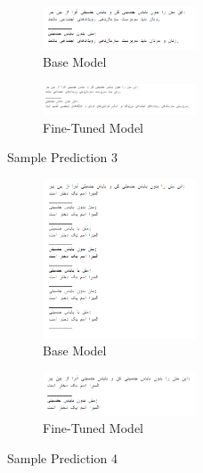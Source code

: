 \documentclass{solutionclass} %
\begin{document}
\begin{figure}[ht!]
	\centering
\begin{subfigure}[t]{0.5\textwidth}
	\centering
	\includegraphics[width=0.5\textwidth]{img/3/s3b.png}
	\caption{Base Model}
\end{subfigure}%

\bigskip

\begin{subfigure}[t]{0.5\textwidth}
	\centering
	\includegraphics[width=0.5\textwidth]{img/3/s3f.png}
	\caption{Fine-Tuned Model}
\end{subfigure}
	\caption{Sample Prediction 3}
\end{figure}






\begin{figure}[ht!]
	\centering
\begin{subfigure}[t]{0.5\textwidth}
	\centering
	\includegraphics[width=0.5\textwidth]{img/3/s4b.png}
	\caption{Base Model}
\end{subfigure}%

\bigskip

\begin{subfigure}[t]{0.5\textwidth}
	\centering
	\includegraphics[width=0.5\textwidth]{img/3/s4f.png}
	\caption{Fine-Tuned Model}
\end{subfigure}
	\caption{Sample Prediction 4}
\end{figure}
\end{document}
